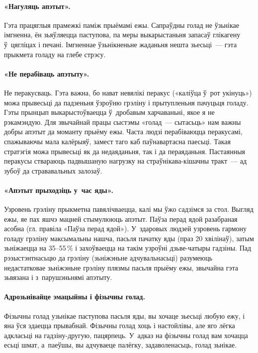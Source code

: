 \paragraph{«Нагуляць апэтыт».}
Гэта працяглыя прамежкі паміж прыёмамі ежы. Сапраўдны голад не ўзьнікае імгненна, ён зьяўляецца паступова, па меры выкарыстаньня запасаў глікагену ў~цягліцах і печані. Імгненнае ўзьнікненьне жаданьня нешта зьесьці~--- гэта прыкмета голаду на глебе стрэсу.

\paragraph{«Не перабіваць апэтыту».}
Не перакусваць. Гэта важна, бо нават невялікі перакус («каліўца ў~рот укінуць») можа прывесьці да падзеньня ўзроўню грэліну і прытупленьня пачуцьця голаду. Гэты прынцып выкарыстоўваецца ў~дробавым харчаваньні, якое я не рэкамэндую. Для звычайнай працы сыстэмы «голад~--- сытасьць» нам важны добры апэтыт да моманту прыёму ежы. Часта людзі перабіваюцца перакусамі, спажываючы мала калёрыяў, замест таго каб паўнавартасна паесьці. Такая стратэгія можа прывесьці як да недаяданьня, так і да пераяданьня. Пастаянныя перакусы ствараюць падвышаную нагрузку на страўнікава-кішачны тракт~--- ад зубоў да стрававальных залозаў.


\paragraph{«Апэтыт прыходзіць у~час яды».}
Узровень грэліну прыкметна павялічваецца, калі мы ўжо садзімся за стол. Выгляд ежы, яе пах яшчэ мацней стымулююць апэтыт. Паўза перад ядой разабраная асобна (гл. правіла «Паўза перад ядой»). У~здаровых людзей узровень гармону голаду грэліну максымальны нашча, пасьля пачатку яды (праз 20 хвілінаў), затым зьніжаецца на 35--55\,\% і захоўваецца на такім узроўні дзьве-чатыры гадзіны. Пад рэзыстэнтнасьцю да грэліну (зьніжэньне адчувальнасьці) разумеюць недастатковае зьніжэньне грэліну плязмы пасьля прыёму ежы, звычайна гэта зьвязана і з~парушэньнямі апэтыту.

\paragraph{Адрозьнівайце эмацыйны і фізычны голад.}
Фізычны голад узьнікае паступова пасьля яды, вы хочаце зьесьці любую ежу, і яна ўся здаецца прывабнай. Фізычны голад хоць і настойлівы, але яго лёгка адкласьці на гадзіну-другую, пацярпець. У~адказ на фізычны голад вам хочацца есьці шмат, а~паеўшы, вы адчуваеце палёгку, задаволенасьць, голад зьнікае.

